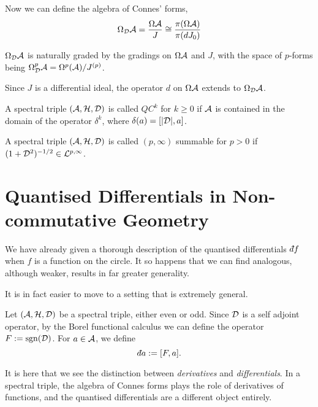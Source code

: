 Now we can define the algebra of Connes' forms,
\begin{equation*}
    \Omega_{\mathcal{D}}\mathcal{A} = \frac{\Omega \mathcal{A}}{J} \cong \frac{\pi(\Omega \mathcal{A})}{\pi(dJ_0)}
\end{equation*}

$\Omega_{\mathcal{D}} \mathcal{A}$ is naturally graded by the gradings on $\Omega \mathcal{A}$ and $J$, with the 
space of $p$-forms being $\Omega^p_{\mathcal{D}} \mathcal{A} = \Omega^p(\mathcal{A})/J^{(p)}$.

Since $J$ is a differential ideal, the operator $d$ on $\Omega \mathcal{A}$
extends to $\Omega_{\mathcal{D}} \mathcal{A}$.  


\begin{definition}
    A spectral triple $(\mathcal{A},\mathcal{H},\mathcal{D})$ is called $QC^k$ for $k \geq 0$
    if $\mathcal{A}$ is contained in the domain of the operator $\delta^k$, where $\delta(a) = [|\mathcal{D}|,a]$.
\end{definition}

\begin{definition}[Summability]
    A spectral triple $(\mathcal{A},\mathcal{H},\mathcal{D})$ is called $(p,\infty)$ summable
    for $p > 0$ if $(1+\mathcal{D}^2)^{-1/2} \in \mathcal{L}^{p,\infty}$.
\end{definition}

        
\section{Quantised Differentials in Non-commutative Geometry}
We have already given a thorough description of the quantised differentials $\qd f$
when $f$ is a function on the circle. It so happens that we can find
analogous, although weaker, results in far greater generality.

It is in fact easier to move to a setting that is extremely general.

\begin{definition}
    Let $(\mathcal{A},\mathcal{H},\mathcal{D})$ be a spectral triple, either even or odd. Since $\mathcal{D}$
    is a self adjoint operator, by the Borel functional calculus
    we can define the operator $F := \operatorname{sgn}(\mathcal{D})$. For $a \in \mathcal{A}$, we define
    \begin{equation}
        \qd a := [F,a].
    \end{equation}
\end{definition}

It is here that we see the distinction between \emph{derivatives}
and \emph{differentials}. In a spectral triple, the algebra
of Connes forms plays the role of derivatives of functions, and the quantised
differentials are a different object entirely.

